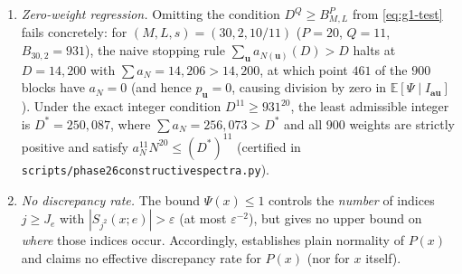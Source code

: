 \documentclass[11pt]{article}
\newcommand{\ttt}[1]{\texttt{\begingroup\def\_{\textunderscore\discretionary{}{}{}}#1\endgroup}}
\newcommand{\Ex}{\mathbb{E}}
\begin{document}
\begin{remark}\label{rem:g1-rates}
\begin{enumerate}[label=\textup{(\arabic*)},nosep]
\item \emph{Zero-weight regression.} Omitting the condition $D^Q\ge B_{M,L}^P$ from \eqref{eq:g1-test} fails concretely: for $(M,L,s)=(30,2,10/11)$ ($P=20$, $Q=11$, $B_{30,2}=931$), the naive stopping rule $\sum_{\mathbf{u}}a_{N(\mathbf{u})}(D)>D$ halts at $D=14{,}200$ with $\sum a_N=14{,}206>14{,}200$, at which point $461$ of the $900$ blocks have $a_N=0$ (and hence $p_{\mathbf{u}}=0$, causing division by zero in $\Ex[\Psi\mid I_{\mathbf{a}\mathbf{u}}]$). Under the exact integer condition $D^{11}\ge 931^{20}$, the least admissible integer is $D^*=250{,}087$, where $\sum a_N=256{,}073>D^*$ and all $900$ weights are strictly positive and satisfy $a_N^{11}N^{20}\le(D^*)^{11}$ (certified in \ttt{scripts/phase26\_constructive\_spectra.py}).
\item \emph{No discrepancy rate.} The bound $\Psi(x)\le1$ controls the \emph{number} of indices $j\ge J_e$ with $|S_{j^2}(x;e)|>\varepsilon$ (at most $\varepsilon^{-2}$), but gives no upper bound on \emph{where} those indices occur. Accordingly,  establishes plain normality of $P(x)$ and claims no effective discrepancy rate for $P(x)$ (nor for $x$ itself).
\end{enumerate}
\end{remark}
\end{document}
